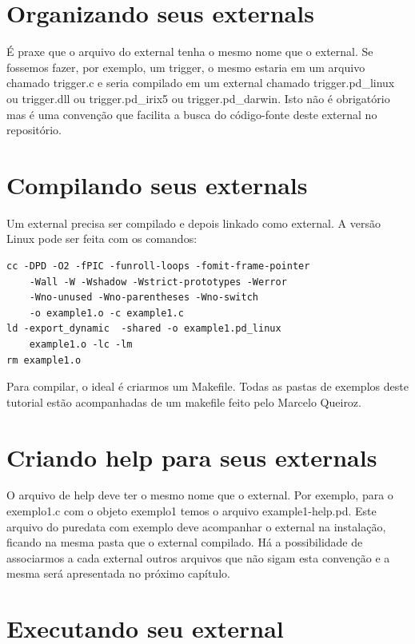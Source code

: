 \documentclass[10pt,a4paper]{report}
\begin{document}
\section{Organizando seus externals}
É praxe que o arquivo do external tenha o mesmo nome que o external. Se fossemos fazer, por exemplo, um trigger, o mesmo estaria em um arquivo chamado trigger.c e seria compilado em um external chamado trigger.pd\_linux ou trigger.dll ou trigger.pd\_irix5 ou trigger.pd\_darwin. Isto não é obrigatório mas é uma convenção que facilita a busca do código-fonte deste external no repositório.

\section{Compilando seus externals}

Um external precisa ser compilado e depois linkado como external. A versão Linux pode ser feita com os comandos:

\begin{lstlisting}
cc -DPD -O2 -fPIC -funroll-loops -fomit-frame-pointer 
	-Wall -W -Wshadow -Wstrict-prototypes -Werror 
	-Wno-unused -Wno-parentheses -Wno-switch 
	-o example1.o -c example1.c
ld -export_dynamic  -shared -o example1.pd_linux 
	example1.o -lc -lm
rm example1.o
\end{lstlisting}

Para compilar, o ideal é criarmos um Makefile. Todas as pastas de exemplos deste tutorial estão acompanhadas de um makefile feito pelo Marcelo Queiroz.

\section{Criando help para seus externals}

O arquivo de help deve ter o mesmo nome que o external. Por exemplo, para o exemplo1.c com o objeto exemplo1 temos o arquivo example1-help.pd. Este arquivo do puredata com exemplo deve acompanhar o external na instalação, ficando na mesma pasta que o external compilado.
Há a possibilidade de associarmos a cada external outros arquivos que não sigam esta convenção e a mesma será apresentada no próximo capítulo.

\section{Executando seu external}
\end{document}
